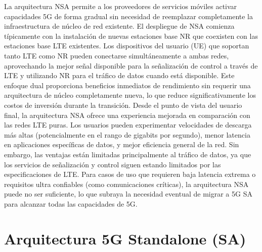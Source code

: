 La arquitectura NSA permite a los proveedores de servicios móviles activar capacidades 5G de forma gradual sin necesidad de reemplazar completamente la infraestructura de núcleo de red existente. El despliegue de NSA comienza típicamente con la instalación de nuevas estaciones base NR que coexisten con las estaciones base LTE existentes. Los dispositivos del usuario (UE) que soportan tanto LTE como NR pueden conectarse simultáneamente a ambas redes, aprovechando la mejor señal disponible para la señalización de control a través de LTE y utilizando NR para el tráfico de datos cuando está disponible. Este enfoque dual proporciona beneficios inmediatos de rendimiento sin requerir una arquitectura de núcleo completamente nueva, lo que reduce significativamente los costos de inversión durante la transición.
Desde el punto de vista del usuario final, la arquitectura NSA ofrece una experiencia mejorada en comparación con las redes LTE puras. Los usuarios pueden experimentar velocidades de descarga más altas (potencialmente en el rango de gigabits por segundo), menor latencia en aplicaciones específicas de datos, y mejor eficiencia general de la red. Sin embargo, las ventajas están limitadas principalmente al tráfico de datos, ya que los servicios de señalización y control siguen estando limitados por las especificaciones de LTE. Para casos de uso que requieren baja latencia extrema o requisitos ultra confiables (como comunicaciones críticas), la arquitectura NSA puede no ser suficiente, lo que subraya la necesidad eventual de migrar a 5G SA para alcanzar todas las capacidades de 5G.


\section{Arquitectura 5G Standalone (SA)}
